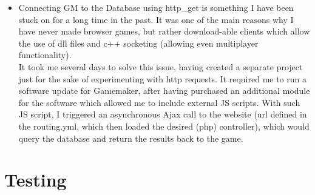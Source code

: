 \documentclass[12pt]{report}
\begin{document}
\begin{itemize}
\item Connecting GM to the Database using http\_get is something I have been stuck on for a long time in the past. It was one of the main reasons why I have never made browser games, but rather download-able clients which allow the use of dll files and c++ socketing (allowing even multiplayer functionality).\\
It took me several days to solve this issue, having created a separate project just for the sake of experimenting with http requests. It required me to run a software update for Gamemaker, after having purchased an additional module for the software which allowed me to include external JS scripts. With such JS script, I triggered an asynchronous Ajax call to the website (url defined in the routing.yml, which then loaded the desired (php) controller), which would query the database and return the results back to the game. 

\end{itemize}

\section*{Testing}
\end{document}
